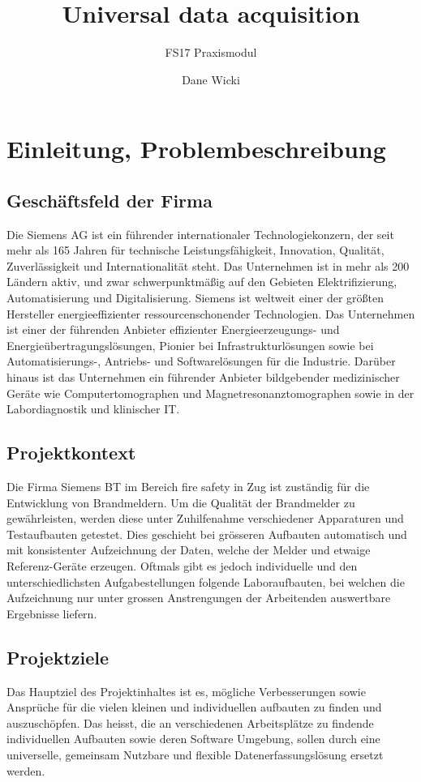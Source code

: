 \documentclass[10pt]{scrartcl}
\author{Dane Wicki}
\title{Universal data acquisition}
\subtitle{FS17 Praxismodul}
\begin{document}
\maketitle
\tableofcontents
\section{Einleitung, Problembeschreibung}
\subsection{Geschäftsfeld der Firma}
Die Siemens AG ist ein führender internationaler Technologiekonzern, der seit mehr als 165 Jahren für technische Leistungsfähigkeit, Innovation, Qualität, Zuverlässigkeit und Internationalität steht. Das Unternehmen ist in mehr als 200 Ländern aktiv, und zwar schwerpunktmäßig auf den Gebieten Elektrifizierung, Automatisierung und Digitalisierung. Siemens ist weltweit einer der größten Hersteller energieeffizienter ressourcenschonender Technologien. Das Unternehmen ist einer der führenden Anbieter effizienter Energieerzeugungs- und Energieübertragungslösungen, Pionier bei Infrastrukturlösungen sowie bei Automatisierungs-, Antriebs- und Softwarelösungen für die Industrie. Darüber hinaus ist das Unternehmen ein führender Anbieter bildgebender medizinischer Geräte wie Computertomographen und Magnetresonanztomographen sowie in der Labordiagnostik und klinischer IT.  
\subsection{Projektkontext}
Die Firma Siemens BT im Bereich fire safety in Zug ist zuständig für die Entwicklung von Brandmeldern.
Um die Qualität der Brandmelder zu gewährleisten, werden diese unter Zuhilfenahme
verschiedener Apparaturen und Testaufbauten getestet. Dies geschieht bei grösseren Aufbauten automatisch und mit konsistenter Aufzeichnung der Daten, welche der Melder und etwaige Referenz-Geräte erzeugen. Oftmals gibt es jedoch individuelle und den unterschiedlichsten Aufgabestellungen folgende Laboraufbauten, bei welchen die Aufzeichnung nur unter grossen Anstrengungen der Arbeitenden auswertbare Ergebnisse liefern.
\subsection{Projektziele}
Das Hauptziel des Projektinhaltes ist es, mögliche Verbesserungen sowie Ansprüche für die vielen kleinen und individuellen aufbauten zu finden und auszuschöpfen. Das heisst, die an verschiedenen Arbeitsplätze zu findende individuellen Aufbauten sowie deren Software Umgebung, sollen durch eine universelle, gemeinsam Nutzbare und flexible Datenerfassungslösung ersetzt werden.
\end{document}
